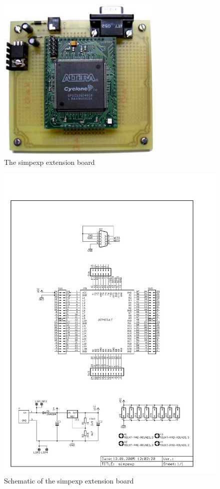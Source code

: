 \begin{figure}[h]
    \centering
    \includegraphics[height=80mm]{appendix/simpexp}
    \caption{The simpexp extension board}
\end{figure}
\begin{figure}
    \centering
    \includegraphics[scale=0.68]{appendix/simpexp_p1}
    \caption{Schematic of the simpexp extension board}
\end{figure}

